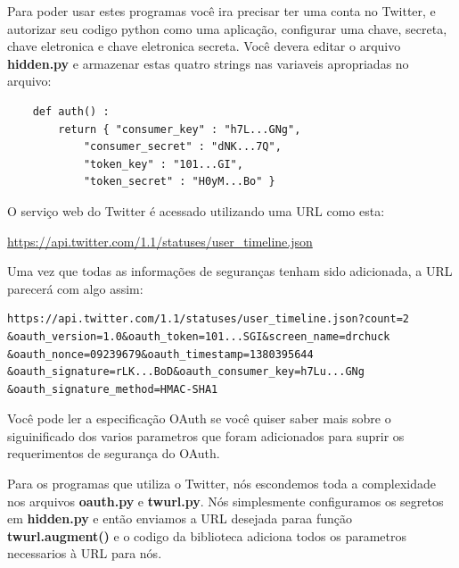 Para poder usar estes programas você ira precisar ter uma conta
no Twitter, e autorizar seu codigo python como uma aplicação,
configurar uma chave, secreta, chave eletronica e chave eletronica
secreta. Você devera editar o arquivo {\bf hidden.py} e armazenar
estas quatro strings nas variaveis apropriadas no arquivo:

\beforeverb
\begin{verbatim}
    def auth() :
        return { "consumer_key" : "h7L...GNg",
            "consumer_secret" : "dNK...7Q",
            "token_key" : "101...GI",
            "token_secret" : "H0yM...Bo" }
\end{verbatim}
\afterverb
%
O serviço web do Twitter é acessado utilizando uma URL como esta:

\url{https://api.twitter.com/1.1/statuses/user_timeline.json}

Uma vez que todas as informações de seguranças tenham sido adicionada,
a URL parecerá com algo assim:

\beforeverb
\begin{verbatim}
https://api.twitter.com/1.1/statuses/user_timeline.json?count=2
&oauth_version=1.0&oauth_token=101...SGI&screen_name=drchuck
&oauth_nonce=09239679&oauth_timestamp=1380395644
&oauth_signature=rLK...BoD&oauth_consumer_key=h7Lu...GNg
&oauth_signature_method=HMAC-SHA1
\end{verbatim}
\afterverb
%
Você pode ler a especificação OAuth se você quiser saber mais
sobre o siguinificado dos varios parametros que foram adicionados
para suprir os requerimentos de segurança do OAuth.

Para os programas que utiliza o Twitter, nós escondemos toda
a complexidade nos arquivos {\bf oauth.py} e {\bf twurl.py}.
Nós simplesmente configuramos os segretos em {\bf hidden.py}
e então enviamos a URL desejada paraa função 
{\bf twurl.augment()} e o codigo da biblioteca adiciona todos
os parametros necessarios à URL para nós.

